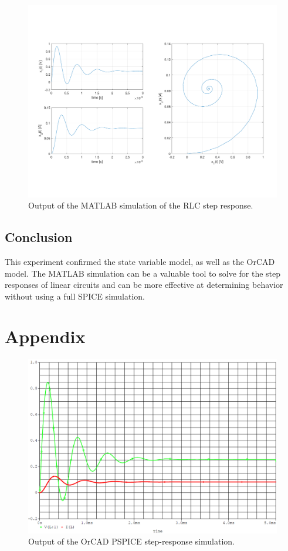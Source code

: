 \documentclass{report}
\begin{document}
\begin{figure}[H]
	\centering
%	
	\includegraphics[width=\textwidth, trim=20 100 20 100, clip]{matlab.pdf}
	\caption{Output of the MATLAB simulation of the RLC step response.}
	\label{fig:matlab}
\end{figure}

\subsection{Conclusion}
This experiment confirmed the state variable model, as well as the OrCAD model. The MATLAB simulation can be a valuable tool to solve for the step responses of linear circuits and can be more effective at determining behavior without using a full SPICE simulation.
\pagebreak

\section*{Appendix}
\begin{figure}[h]
	\centering
	\includegraphics[width=1\linewidth]{rlcsim}
	\caption{Output of the OrCAD PSPICE step-response simulation.}
	\label{fig:rlcsim}
\end{figure}
\end{document}
